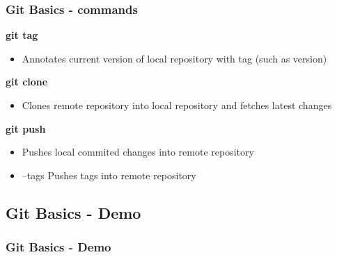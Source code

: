 \begin{frame}
\frametitle{Git Basics - commands}
\textbf{git tag}
	\begin{itemize}
	\item Annotates current version of local repository with tag (such as version)
	\end{itemize}
\textbf{git clone}
	\begin{itemize}
	\item Clones remote repository into local repository and fetches latest changes
	\end{itemize}
\textbf{git push}
	\begin{itemize}
	\item Pushes local commited changes into remote repository
	\item --tags Pushes tags into remote repository
	\end{itemize}
\end{frame}




\subsection[]{Git Basics - Demo}
\begin{frame}
\frametitle{Git Basics - Demo}
\end{frame}









